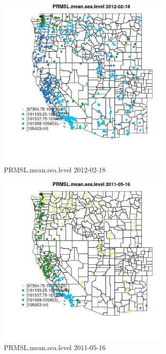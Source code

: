 \begin{figure} 
\centering  
\includegraphics[width=0.77\textwidth]{Code_Outputs/Report_ML_input_PM25_Step4_part_f_de_duplicated_aves_prioritize_24hr_obswNAs_MapObsPRMSLmeansealevel2012-02-18.jpg} 
\caption{\label{fig:Report_ML_input_PM25_Step4_part_f_de_duplicated_aves_prioritize_24hr_obswNAsMapObsPRMSLmeansealevel2012-02-18}PRMSL.mean.sea.level 2012-02-18} 
\end{figure} 
 

\begin{figure} 
\centering  
\includegraphics[width=0.77\textwidth]{Code_Outputs/Report_ML_input_PM25_Step4_part_f_de_duplicated_aves_prioritize_24hr_obswNAs_MapObsPRMSLmeansealevel2011-05-16.jpg} 
\caption{\label{fig:Report_ML_input_PM25_Step4_part_f_de_duplicated_aves_prioritize_24hr_obswNAsMapObsPRMSLmeansealevel2011-05-16}PRMSL.mean.sea.level 2011-05-16} 
\end{figure} 
 

